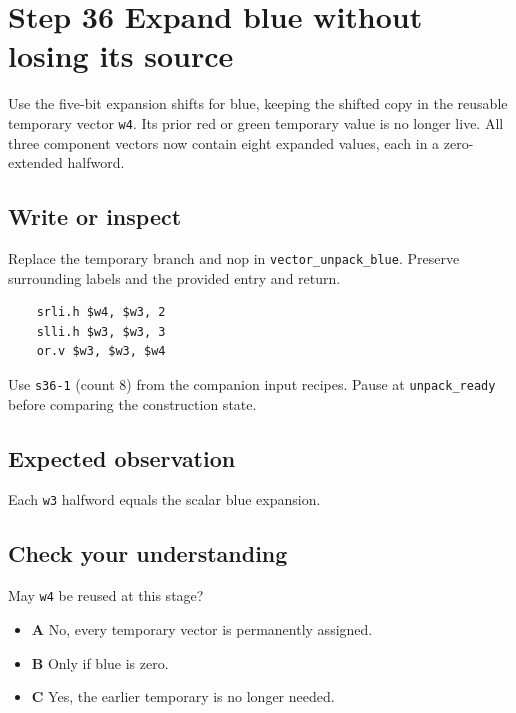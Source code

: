 \section{Step 36 Expand blue without losing its source}\label{rgb-s36}

Use the five-bit expansion shifts for blue, keeping the shifted copy in the reusable temporary vector \texttt{w4}. Its prior red or green temporary value is no longer live. All three component vectors now contain eight expanded values, each in a zero-extended halfword.

\subsection{Write or inspect}
Replace the temporary branch and nop in \texttt{vector\_unpack\_blue}. Preserve surrounding labels and the provided entry and return.

\begin{verbatim}
    srli.h $w4, $w3, 2
    slli.h $w3, $w3, 3
    or.v $w3, $w3, $w4
\end{verbatim}
Use \texttt{s36-1} (count 8) from the companion input recipes. Pause at \texttt{unpack\_ready} before comparing the construction state.

\subsection{Expected observation}
Each \texttt{w3} halfword equals the scalar blue expansion.

\subsection{Check your understanding}
May \texttt{w4} be reused at this stage?

\begin{itemize}
  \item \textbf{A} No, every temporary vector is permanently assigned.
  \item \textbf{B} Only if blue is zero.
  \item \textbf{C} Yes, the earlier temporary is no longer needed.
\end{itemize}
